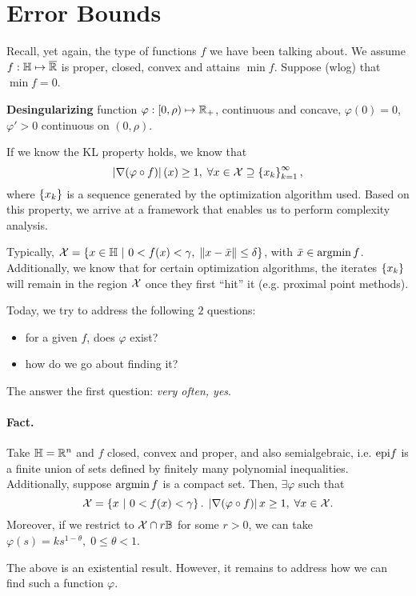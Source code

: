 \section{Error Bounds}
Recall, yet again, the type of functions $f$ we have been talking about. We
assume $f: \mathbb{H} \mapsto \overline{\mathbb{R}}$ is proper, closed, convex and attains
$\min f$. Suppose (wlog) that $\min f = 0$.

\textbf{Desingularizing} function $\varphi: [0, \rho) \mapsto \mathbb{R}_+$,
continuous and concave, $\varphi(0) = 0$, $\varphi' > 0$ continuous on $(0,
\rho)$.

If we know the KL property holds, we know that
\[
	\left| \nabla (\varphi \circ f) \right|(x) \geq 1, \;
	\forall x \in \mathcal{X} \supseteq \left\{ x_k \right\}_{k=1}^{\infty},
\]
where $\left\{ x_k \right\}$ is a sequence generated by the optimization algorithm used.
Based on this property, we arrive at a framework that enables us to perform
complexity analysis.

Typically, $\mathcal{X} = \left\{ x \in \mathbb{H} \ \middle| \  0 < f(x) < \gamma, \; \left \| x - \bar{x} \right \|
\leq \delta \right\}$, with $\bar{x} \in \operatorname*{argmin} f$. Additionally, we know that for
certain optimization algorithms, the iterates $\left\{ x_k \right\}$ will remain in the
region $\mathcal{X}$ once they first ``hit'' it (e.g. proximal point methods).

Today, we try to address the following $2$ questions:
\begin{itemize}
	\item for a given $f$, does $\varphi$ exist?
	\item how do we go about finding it?
\end{itemize}

The answer the first question: \textit{very often, yes}.

\paragraph{Fact.} Take $\mathbb{H} = \mathbb{R}^n$ and $f$ closed, convex and proper, and
also semialgebraic, i.e. $\mathrm{epi} f$ is a finite union of sets defined by finitely
many polynomial inequalities. Additionally, suppose $\operatorname*{argmin} f$ is a compact
set. Then, $\exists \varphi$ such that
\[
	\mathcal{X} = \left\{ x \ \middle| \  0 < f(x) < \gamma \right\}. \; \left| \nabla (\varphi \circ f) \right|{x}
	\geq 1, \; \forall x \in \mathcal{X}.
\]
Moreover, if we restrict to $\mathcal{X} \cap r \mathbb{B}$ for some $r > 0$, we can
take $\varphi(s) = k s^{1 - \theta}, \; 0 \leq \theta < 1$.

The above is an existential result. However, it remains to address how we can
find such a function $\varphi$.

